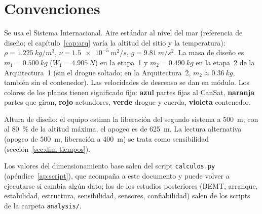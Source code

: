 \section{Convenciones}
Se usa el Sistema Internacional. Aire estándar al nivel del mar (referencia de diseño; el
capítulo~\ref{cap:arq} varía la altitud del sitio y la temperatura):
$\rho=\SI{1.225}{kg/m^3}$, $\nu=\SI{1.5e-5}{m^2/s}$, $g=\SI{9.81}{m/s^2}$. La masa de
diseño es $m_1=\SI{0.500}{kg}$ ($W_1=\SI{4.905}{N}$) en la etapa~1 y $m_2=\SI{0.490}{kg}$ en la etapa~2 de la Arquitectura~1 (sin el drogue soltado; en la
Arquitectura~2, $m_2\approx\SI{0.36}{kg}$, también sin el contenedor). Las velocidades de descenso se dan en
módulo. Los colores de los planos tienen significado fijo:
\textcolor{cfijo}{\textbf{azul}} partes fijas al CanSat,
\textcolor{crot}{\textbf{naranja}} partes que giran,
\textcolor{cfreno}{\textbf{rojo}} actuadores,
\textcolor{ccuerda}{\textbf{verde}} drogue y cuerda,
\textcolor{ccont}{\textbf{violeta}} contenedor.

Altura de diseño: el equipo estima la liberación del segundo sistema a \SI{500}{m}; con
 al \SI{80}{\percent} de la altitud máxima, el apogeo es de \SI{625}{m}. La lectura
alternativa (apogeo de \SI{500}{m}, liberación a \SI{400}{m}) se trata como sensibilidad
(sección~\ref{sec:dim-tiempos}).

Los valores del dimensionamiento base salen del script \texttt{calculos.py}
(apéndice~\ref{ap:script}), que acompaña a este documento y puede volver a ejecutarse si
cambia algún dato; los de los estudios posteriores (BEMT, arranque, estabilidad, estructura,
sensibilidad, sensores, confiabilidad) salen de los scripts de la carpeta \texttt{analysis/}.
